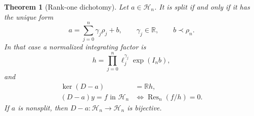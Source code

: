 \documentclass[11pt,a4paper]{article}
\numberwithin{equation}{section}
\newtheorem{theorem}{Theorem}[section]
\theoremstyle{definition}
\theoremstyle{remark}\newtheorem{remark}[theorem]{Remark}
\newcommand{\R}{\mathbb R}\newcommand{\C}{\mathbb C}
\newcommand{\Hh}{\mathcal H}\newcommand{\Ll}{\mathcal L}
\newcommand{\Res}{\operatorname{Res}}\newcommand{\supp}{\operatorname{supp}}
\begin{document}
\begin{theorem}[Rank-one dichotomy]
\label{thm:rankone}
Let $a\in\Hh_n$. It is split if and only if it has the unique form
\begin{equation}
 a=\sum_{j=0}^n\gamma_j\rho_j+b,
 \qquad\gamma_j\in\R,\qquad b\prec\rho_n.
 \label{eq:splitcriterion}
\end{equation}
In that case a normalized integrating factor is
\begin{equation}
 h=\prod_{j=0}^n\ell_j^{\gamma_j}\exp(I_n b),
 \label{eq:h}
\end{equation}
and
\begin{align}
 \ker(D-a)&=\R h,\label{eq:splitkernel}\\
 (D-a)y=f\text{ in }\Hh_n
 &\Longleftrightarrow\Res_n(f/h)=0.\label{eq:splitrange}
\end{align}
If $a$ is nonsplit, then $D-a:\Hh_n\to\Hh_n$ is bijective.
\end{theorem}
\end{document}
